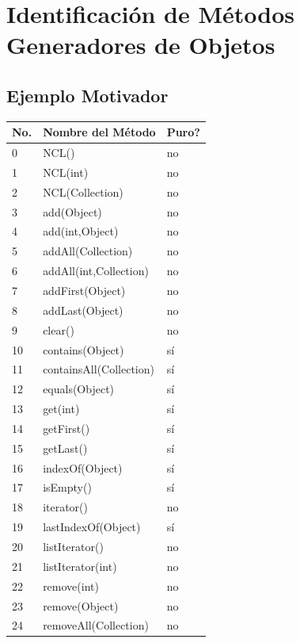\chapter[Identificación de Métodos Generadores de Objetos]{Identificación de Métodos Generadores de Objetos}
\label{cap:builders}


\section{Ejemplo Motivador}

\begin{table}[]
\centering
{\scriptsize
\begin{tabular}{|l|l|l|}
\hline
No. & Nombre del Método & Puro? \\
\hline
0 & NCL() & no \\
1 & NCL(int) & no \\
2 & NCL(Collection) & no \\
3 & add(Object) & no \\
4 & add(int,Object) & no \\
5 & addAll(Collection) & no \\
6 & addAll(int,Collection) & no \\
7 & addFirst(Object) & no \\
8 & addLast(Object) & no \\
9 & clear() & no \\
10 & contains(Object) & sí \\
11 & containsAll(Collection) & sí \\
12 & equals(Object) & sí \\
13 & get(int) & sí \\
14 & getFirst() & sí \\
15 & getLast() & sí \\
16 & indexOf(Object) & sí \\
17 & isEmpty() & sí \\
18 & iterator() & no \\
19 & lastIndexOf(Object) & sí \\
20 & listIterator() & no \\
21 & listIterator(int) & no \\
22 & remove(int) & no \\
23 & remove(Object) & no \\
24 & removeAll(Collection) & no \\

\end{tabular}}
\end{table}
